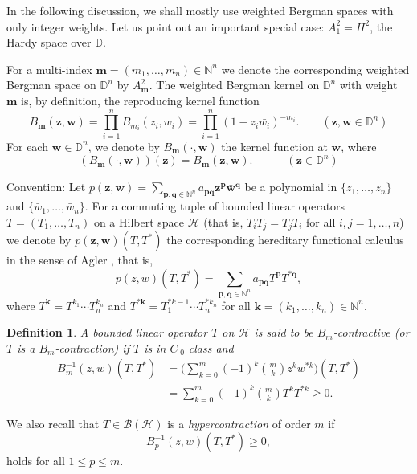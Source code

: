 \documentclass[12pt]{amsart}
\newtheorem{Definition}[Theorem]{\sc Definition}
\begin{document}
In the following discussion, we shall mostly use weighted Bergman
spaces with only integer weights. Let us point out an important
special case: $A^2_1 = H^2$, the Hardy space over ${\mathbb{D}}$.

For a multi-index ${\bm{m}} = (m_1, \ldots, m_n) \in {\mathbb{N}}^n$ we denote the
corresponding weighted Bergman space on ${\mathbb{D}}^n$ by $A^2_{\bm{m}}$. The
weighted Bergman kernel on ${\mathbb{D}}^n$ with weight ${\bm{m}}$ is, by
definition, the reproducing kernel function \[B_{\bm{m}}({\bm{z}}, {\bm{w}}) =
\prod_{i=1}^n B_{m_i}(z_i, w_i) = \prod_{i=1}^n (1 - z_i
\bar{w_i})^{-m_i}. \quad \quad ({\bm{z}}, {\bm{w}} \in {\mathbb{D}}^n)\] For each ${\bm{w}} \in
{\mathbb{D}}^n$, we denote by $B_{\bm{m}}(\cdot, {\bm{w}})$ the kernel function at ${\bm{w}}$,
where
\[(B_{\bm{m}}(\cdot, {\bm{w}}))({\bm{z}}) = B_{\bm{m}}({\bm{z}}, {\bm{w}}). \quad \quad \quad ({\bm{z}} \in
{\mathbb{D}}^n)\]

{\noindent}\textsf{Convention:} Let $p({\bm{z}}, {\bm{w}}) = \sum_{\bm{p}, \bm{q} \in
{\mathbb{N}}^n} a_{\bm{p} \bm{q}} {\bm{z}}^{\bm{p}} \bar{\bm{w}}^{\bm{q}}$ be a
polynomial in $\{z_1, \ldots, z_n\}$ and $\{\bar{w}_1, \ldots,
\bar{w}_n\}$. For a commuting tuple of bounded linear operators $T =
(T_1, \ldots, T_n)$ on a Hilbert space ${\mathcal{H}}$ (that is, $T_i T_j =
T_j T_i$ for all $i, j = 1, \ldots, n$) we denote by $p({\bm{z}}, {\bm{w}})(T,
T^*)$ the corresponding hereditary functional calculus in the sense
of Agler \cite{Ag}, that is,
\begin{equation}\label{hered}p(z, w)(T, T^*) = \sum_{\bm{p}, \bm{q} \in {\mathbb{N}}^n} a_{\bm{p}
\bm{q}} T^{\bm{p}} T^{* \bm{q}},
\end{equation}
where $T^{\bm{k}} = T^{k_1} \cdots T^{k_n}_n$ and $T^{*\bm{k}} =
T_1^{*k-1} \cdots T_n^{*k_n}$ for all $\bm{k} =(k_1, \ldots, k_n)
\in \mathbb{N}^n$.

\begin{Definition}
A bounded linear operator $T$ on ${\mathcal{H}}$ is said to be
$B_m$-contractive (or $T$ is a $B_m$-contraction) if $T$ is in
$C_{\cdot 0}$ class and \[\begin{split}B_m^{-1}(z, w)(T, T^*) & =
\big(\sum_{k=0}^m (-1)^k {m\choose k} {z}^k \bar{w}^{*k}\big)(T, T^*) \\
&= \sum_{k=0}^m (-1)^k {m\choose k} T^k T^{*k} \geq 0.\end{split}\]
\end{Definition}

We also recall that $T \in {\mathcal{B}}({\mathcal{H}})$ is a
\textit{hypercontraction} of order $m$ if
\[B_p^{-1}(z, w)(T, T^*) \geq 0,\]holds for all $1 \leq p \leq m$.
\end{document}
